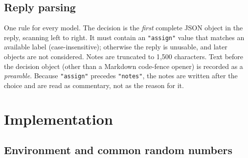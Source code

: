 \documentclass[11pt,letterpaper]{article}
\numberwithin{equation}{section}
\numberwithin{table}{section}
\numberwithin{figure}{section}
\numberwithin{algorithm}{section}
\begin{document}
\subsection{Reply parsing}

One rule for every model. The decision is the \emph{first} complete JSON object in the reply, scanning left to right. It must contain an \texttt{"assign"} value that matches an available label (case-insensitive); otherwise the reply is unusable, and later objects are not considered. Notes are truncated to 1{,}500 characters. Text before the decision object (other than a Markdown code-fence opener) is recorded as a \emph{preamble}. Because \texttt{"assign"} precedes \texttt{"notes"}, the notes are written after the choice and are read as commentary, not as the reason for it.

\section{Implementation}\label{app:impl}

\subsection{Environment and common random numbers}
\end{document}
